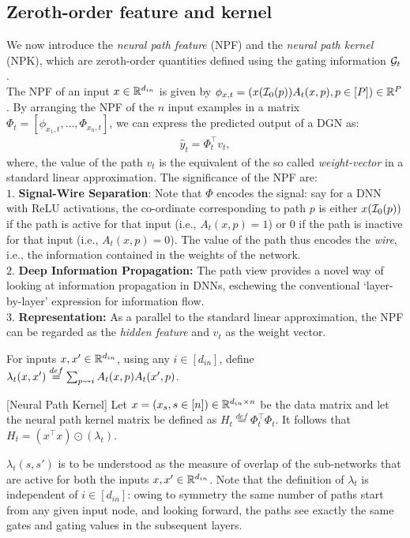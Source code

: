 \subsection{Zeroth-order feature and kernel}
We now introduce the \emph{neural path feature} (NPF) and the \emph{neural path kernel} (NPK), which are zeroth-order quantities defined using the gating information $\mathcal{G}_t$.\\
The NPF of an input $x\in \mathbb{R}^{d_{in}}$ is given by $\phi_{x,t}=(x(\mathcal{I}_0(p))A_t(x,p) ,p\in[P])\in\mathbb{R}^P$. By arranging the NPF of the $n$ input examples in a matrix $\Phi_t=\left[\phi_{x_1,t},\ldots, \Phi_{x_n,t}\right]$, we can express the predicted output of a DGN as: \begin{align}\label{eq:npfbasic}\hat{y}_t=\Phi_t^\top v_t,\end{align}
where, the value of the path $v_t$ is the equivalent of the so called \emph{weight-vector} in a standard linear approximation. The significance of the NPF are:\hfill\\
$1.$ \textbf{Signal-Wire Separation}: Note that $\Phi$ encodes the signal: say for a DNN with ReLU activations, the co-ordinate corresponding to path $p$ is either $x(\mathcal{I}_0(p))$ if the path is active for that input (i.e., $A_t(x,p)=1$) or $0$ if the path is inactive for that input  (i.e., $A_t(x,p)=0$). The value of the path thus encodes the \emph{wire}, i.e., the information contained in the weights of the network. \hfill\\
$2.$ \textbf{Deep Information Propagation:} The path view provides a novel way of looking at information propagation in DNNs, eschewing the conventional `layer-by-layer' expression for information flow.\hfill\\
$3.$ \textbf{Representation:} As a parallel to the standard linear approximation, the NPF can be regarded as the \emph{hidden feature} and $v_t$ as the weight vector.
\begin{definition}\label{def:lambda}
For inputs $x,x'\in\mathbb{R}^{d_{in}}$, using any $i\in [d_{in}]$,  define $\lambda_t(x,x')\stackrel{def}{=}\sum_{p\rightsquigarrow i} A_t(x,p) A_t(x',p)$.
 \end{definition} 
\begin{lemma}\label{lm:npk}[Neural Path Kernel] 
Let $x=(x_s,s\in [n])\in\mathbb{R}^{d_{in}\times n}$ be the data matrix and let the neural path kernel matrix be defined as $H_t\stackrel{def}=\Phi^\top_t\Phi_t$. It follows that $H_t= (x^\top x)\odot(\lambda_t)$. 
\end{lemma}
$\lambda_t(s,s')$ is to be understood as the measure of overlap of the sub-networks that are active for both the inputs $x,x'\in\mathbb{R}^{d_{in}}$. Note that the definition of $\lambda_t$ is independent of $i\in [d_{in}]$: owing to symmetry the same number of paths start from any given input node, and looking forward, the paths see exactly the same gates and gating values in the subsequent layers.
